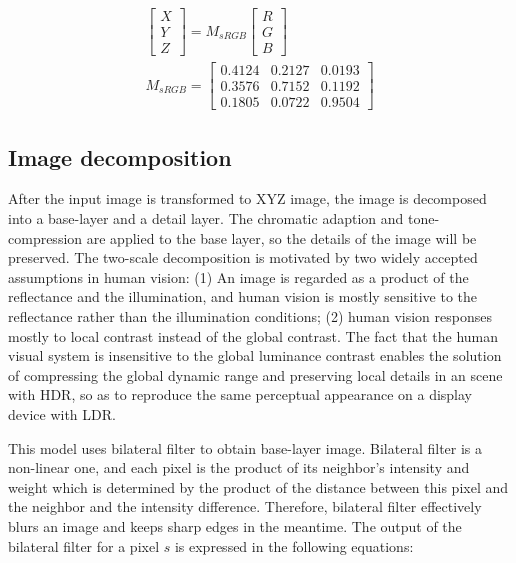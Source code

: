 \documentclass[10pt,twocolumn,letterpaper]{article}
\begin{document}
\begin{align}
	\left[
		\begin{array}{c}
		X\\
		Y\\
		Z
		\end{array}
	\right]
	= M_{sRGB}
	\left[
		\begin{array}{c}
		R\\
		G\\
		B
		\end{array}
	\right]\\
	M_{sRGB} = 
	\left[
		\begin{array}{ccc}
		0.4124&0.2127&0.0193\\
		0.3576&0.7152&0.1192\\
		0.1805&0.0722&0.9504
		\end{array}
	\right]
\end{align}

\subsection{Image decomposition}
\label{sec:partb}
After the input image is transformed to XYZ image, the image is decomposed into a base-layer and a detail layer. The chromatic adaption and tone-compression are applied to the base layer, so the details of the image will be preserved. The two-scale decomposition is motivated by two widely accepted assumptions in human vision: (1) An image is regarded as a product of the reflectance and the illumination, and human vision is mostly sensitive to the reflectance rather than the illumination conditions; (2) human vision responses mostly to local contrast instead of the global contrast\cite{kuang2007icam06}. The fact that the human visual system is insensitive to the global luminance contrast enables the solution of compressing the global dynamic range and preserving local details in an scene with HDR, so as to reproduce the same perceptual appearance on a display device with LDR.

This model uses bilateral filter to obtain base-layer image. Bilateral filter is a non-linear one, and each pixel is the product of its neighbor's intensity and weight which is determined by the product of the distance between this pixel and the neighbor and the intensity difference. Therefore, bilateral filter effectively blurs an image and keeps sharp edges in the meantime. The output of the bilateral filter for a pixel $s$ is expressed in the following equations:
\end{document}
